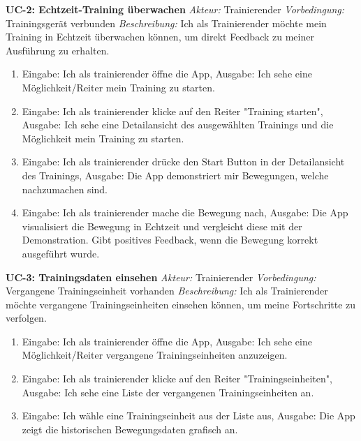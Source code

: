 \documentclass[11pt, a4paper]{article}
\begin{document}
\textbf{UC-2: Echtzeit-Training überwachen} \vspace{.25cm} \newline 
\textit{Akteur:} Trainierender \quad 
\textit{Vorbedingung:} Trainingsgerät verbunden \newline
\textit{Beschreibung:} Ich als Trainierender möchte mein Training in Echtzeit überwachen können, um direkt Feedback zu meiner Ausführung zu erhalten.
\begin{enumerate}[nosep]
    \item Eingabe: Ich als trainierender öffne die App, Ausgabe: Ich sehe eine Möglichkeit/Reiter mein Training zu starten.
    \item Eingabe: Ich als trainierender klicke auf den Reiter "Training starten", Ausgabe: Ich sehe eine Detailansicht des ausgewählten Trainings und die Möglichkeit mein Training zu starten.
    \item Eingabe: Ich als trainierender drücke den Start Button in der Detailansicht des Trainings, Ausgabe: Die App demonstriert mir Bewegungen, welche nachzumachen sind.
    \item Eingabe: Ich als trainierender mache die Bewegung nach, Ausgabe: Die App visualisiert die Bewegung in Echtzeit und vergleicht diese mit der Demonstration. Gibt positives Feedback, wenn die Bewegung korrekt ausgeführt wurde.
\end{enumerate}

\vspace{0.5cm}

\textbf{UC-3: Trainingsdaten einsehen} \vspace{.25cm} \newline 
\textit{Akteur:} Trainierender \quad 
\textit{Vorbedingung:} Vergangene Trainingseinheit vorhanden \newline
\textit{Beschreibung:} Ich als Trainierender möchte vergangene Trainingseinheiten einsehen können, um meine Fortschritte zu verfolgen.
\begin{enumerate}[nosep]
    \item Eingabe: Ich als trainierender öffne die App, Ausgabe: Ich sehe eine Möglichkeit/Reiter vergangene Trainingseinheiten anzuzeigen.
    \item Eingabe: Ich als trainierender klicke auf den Reiter "Trainingseinheiten", Ausgabe: Ich sehe eine Liste der vergangenen Trainingseinheiten an.
    \item Eingabe: Ich wähle eine Trainingseinheit aus der Liste aus, Ausgabe: Die App zeigt die historischen Bewegungsdaten grafisch an.
\end{enumerate}
\end{document}
